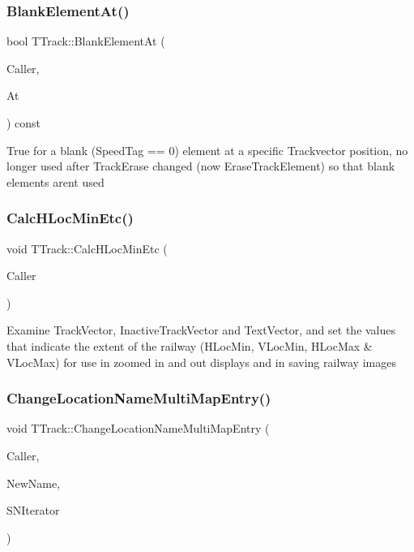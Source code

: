 \subsubsection{\texorpdfstring{Blank\+Element\+At()}{BlankElementAt()}}
{\footnotesize\ttfamily bool T\+Track\+::\+Blank\+Element\+At (\begin{DoxyParamCaption}\item[{int}]{Caller,  }\item[{int}]{At }\end{DoxyParamCaption}) const}

True for a blank (Speed\+Tag == 0) element at a specific Trackvector position, no longer used after Track\+Erase changed (now Erase\+Track\+Element) so that blank elements aren\textquotesingle{}t used \mbox{\label{class_t_track_a20a28eaf0308f7aedcfc78ba9eeadea9}} 
\subsubsection{\texorpdfstring{Calc\+H\+Loc\+Min\+Etc()}{CalcHLocMinEtc()}}
{\footnotesize\ttfamily void T\+Track\+::\+Calc\+H\+Loc\+Min\+Etc (\begin{DoxyParamCaption}\item[{int}]{Caller }\end{DoxyParamCaption})}

Examine Track\+Vector, Inactive\+Track\+Vector and Text\+Vector, and set the values that indicate the extent of the railway (H\+Loc\+Min, V\+Loc\+Min, H\+Loc\+Max \& V\+Loc\+Max) for use in zoomed in and out displays and in saving railway images \mbox{\label{class_t_track_aa081ea276995a63dfa00fc0ace24f5c5}} 
\subsubsection{\texorpdfstring{Change\+Location\+Name\+Multi\+Map\+Entry()}{ChangeLocationNameMultiMapEntry()}}
{\footnotesize\ttfamily void T\+Track\+::\+Change\+Location\+Name\+Multi\+Map\+Entry (\begin{DoxyParamCaption}\item[{int}]{Caller,  }\item[{Ansi\+String}]{New\+Name,  }\item[{T\+Location\+Name\+Multi\+Map\+Iterator}]{S\+N\+Iterator }\end{DoxyParamCaption})}

